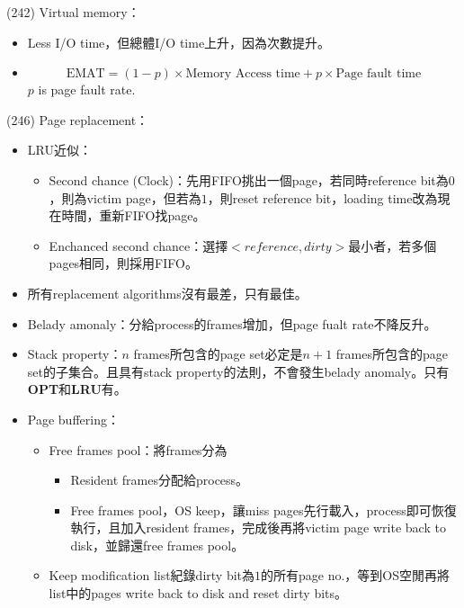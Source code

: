 \begin{theorem}{(242)} Virtual memory：\begin{itemize}
        \item Less I/O time，但總體I/O time上升，因為次數提升。
        \item \begin{equation}
                \text{EMAT} = (1 - p) \times \text{Memory Access time} + p \times \text{Page fault time}
        \end{equation} $p$ is page fault rate.
    \end{itemize}
\end{theorem}

\begin{theorem}{(246)} Page replacement：\begin{itemize}
        \item LRU近似：\begin{itemize}
            \item Second chance (Clock)：先用FIFO挑出一個page，若同時reference bit為$0$，則為victim page，但若為$1$，則reset reference bit，loading time改為現在時間，重新FIFO找page。
            \item Enchanced second chance：選擇$<reference, dirty>$最小者，若多個pages相同，則採用FIFO。
        \end{itemize}
        \item 所有replacement algorithms沒有最差，只有最佳。
        \item Belady amonaly：分給process的frames增加，但page fualt rate不降反升。
        \item Stack property：$n$ frames所包含的page set必定是$n + 1$ frames所包含的page set的子集合。且具有stack property的法則，不會發生belady anomaly。只有\textbf{OPT}和\textbf{LRU}有。
        \item Page buffering：\begin{itemize}
            \item Free frames pool：將frames分為\begin{itemize}
                \item Resident frames分配給process。
                \item Free frames pool，OS keep，讓miss pages先行載入，process即可恢復執行，且加入resident frames，完成後再將victim page write back to disk，並歸還free frames pool。
            \end{itemize} 
            \item Keep modification list紀錄dirty bit為$1$的所有page no.，等到OS空閒再將list中的pages write back to disk and reset dirty bits。
        \end{itemize}
    \end{itemize}
\end{theorem}

